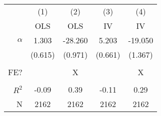 \begin{tabular}{r|cccc}
 & (1) & (2) & (3) & (4) \\ 
& OLS & OLS & IV & IV \\\hline 
$\alpha$ & 1.303 & -28.260  & 5.203  & -19.050 \\ 
& (0.615) & (0.971) & (0.661) & (1.367) \\ 
 &&&& \\ 
FE? & & X & & X \\ 
 &&&& \\ 
$R^2$ & -0.09 & 0.39 & -0.11 & 0.29 \\
N & 2162 & 2162 & 2162 & 2162 \\\hline 
\end{tabular}